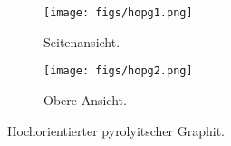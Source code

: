 \begin{figure}[htb]
	\centering
	\begin{subfigure}{0.45\linewidth}
		\texttt{[image: figs/hopg1.png]}
		\caption{Seitenansicht.\cite{skript}}
		\label{fig:hopg1}
	\end{subfigure}
	\hspace{0.5cm}
	\begin{subfigure}{0.45\linewidth}
		\texttt{[image: figs/hopg2.png]}
		\caption{Obere Ansicht.\cite{rtm-leitpfaden}}
		\label{fig:hopg2}
	\end{subfigure}
	\caption{Hochorientierter pyrolyitscher Graphit.}
	\label{fig:hopg-skizze}
\end{figure}